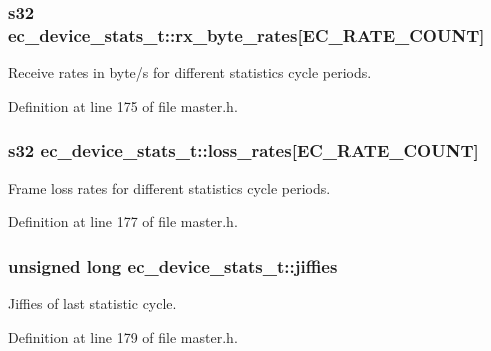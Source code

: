 \subsubsection[{rx\-\_\-byte\-\_\-rates}]{\setlength{\rightskip}{0pt plus 5cm}s32 ec\-\_\-device\-\_\-stats\-\_\-t\-::rx\-\_\-byte\-\_\-rates[{\bf E\-C\-\_\-\-R\-A\-T\-E\-\_\-\-C\-O\-U\-N\-T}]}\label{structec__device__stats__t_a2f9e55c67c34fec5e5d67230598b80d1}


Receive rates in byte/s for different statistics cycle periods. 



Definition at line 175 of file master.\-h.

\subsubsection[{loss\-\_\-rates}]{\setlength{\rightskip}{0pt plus 5cm}s32 ec\-\_\-device\-\_\-stats\-\_\-t\-::loss\-\_\-rates[{\bf E\-C\-\_\-\-R\-A\-T\-E\-\_\-\-C\-O\-U\-N\-T}]}\label{structec__device__stats__t_a3dfa4926b342dd6567647b5a368f224a}


Frame loss rates for different statistics cycle periods. 



Definition at line 177 of file master.\-h.

\subsubsection[{jiffies}]{\setlength{\rightskip}{0pt plus 5cm}unsigned long ec\-\_\-device\-\_\-stats\-\_\-t\-::jiffies}\label{structec__device__stats__t_afd23f1645bfbf7a505dc4e8b5ac5eca0}


Jiffies of last statistic cycle. 



Definition at line 179 of file master.\-h.

